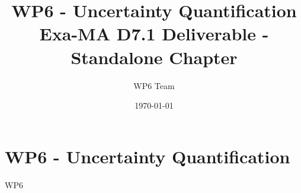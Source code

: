 \documentclass[11pt]{report}
\begin{document}
\title{WP6 - Uncertainty Quantification\\
\large Exa-MA D7.1 Deliverable - Standalone Chapter}
\author{WP6 Team}
\date{\today}
\maketitle

\tableofcontents
\clearpage

\chapter{WP6 - Uncertainty Quantification}
\label{chap:wp6}

{WP6}

\clearpage


\end{document}
